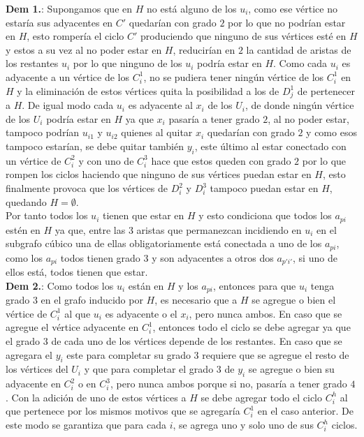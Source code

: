 \documentclass{article}
\begin{document}
\textbf{Dem 1.}: Supongamos que en $H$ no est\'a alguno de los $u_i$, como ese v\'ertice no estar\'ia sus adyacentes en $C'$ quedar\'ian con grado $2$ por lo que no podr\'ian estar en $H$, esto romper\'ia el ciclo $C'$ produciendo 
que ninguno de sus v\'ertices est\'e en $H$ y estos a su vez al no poder estar en $H$, reducir\'ian en $2$ la cantidad de aristas de los restantes $u_i$ por lo que ninguno de los $u_i$ podr\'ia estar en $H$. Como cada $u_i$ es adyacente a un v\'ertice de los $C_i^1$, no se pudiera tener ning\'un v\'ertice de los $C_i^1$ en $H$
y la eliminaci\'on de estos v\'ertices quita la posibilidad a los de $D_j^1$ de pertenecer a $H$. De igual modo cada $u_i$ es adyacente al $x_i$ de los $U_i$, de donde ning\'un v\'ertice de los $U_i$ podr\'ia estar en $H$ ya que $x_i$ pasar\'ia a tener grado $2$, al no poder estar, tampoco podr\'ian $u_{i1}$ y $u_{i2}$ quienes al quitar $x_i$ 
quedar\'ian con grado $2$ y como esos tampoco estar\'ian, se debe quitar tambi\'en $y_i$, este \'ultimo al estar conectado con un v\'ertice de $C_i^2$ y  con uno de $C_i^3$ hace que estos queden con grado $2$ por lo que rompen los ciclos 
haciendo que ninguno de sus v\'ertices puedan estar en $H$, esto finalmente provoca que los v\'ertices de $D_i^2$ y $D_i^3$ tampoco puedan estar en $H$, quedando $H = \emptyset$.\\ 

Por tanto todos los $u_i$ tienen que estar en $H$ y esto condiciona que todos los $a_{pi}$ est\'en en $H$ ya que, entre las $3$ aristas que permanezcan incidiendo en $u_i$ en el subgrafo c\'ubico 
una de ellas obligatoriamente est\'a conectada a uno de los $a_{pi}$, como los $a_{pi}$ todos tienen grado $3$ y son adyacentes a otros dos $a_{p'i'}$, si uno de ellos est\'a, todos tienen que estar.\\ 

\textbf{Dem 2.}: Como todos los $u_i$ est\'an en $H$ y los $a_{pi}$, entonces para que $u_i$ tenga grado $3$ en el grafo inducido por $H$, es necesario que a $H$ se agregue o bien el v\'ertice de $C_i^1$ al que $u_i$ es adyacente o el 
$x_i$, pero nunca ambos. En caso que se agregue el v\'ertice adyacente en $C_i^1$, entonces todo el ciclo se debe agregar ya que el grado $3$ de cada uno de los v\'ertices depende de los restantes. En caso que se agregara el $y_i$ este para completar su grado $3$
requiere que se agregue el resto de los v\'ertices del $U_i$ y que para completar el grado $3$ de $y_i$ se agregue o bien su adyacente en $C_i^2$ o  en $C_i^3$, pero nunca ambos porque si no, pasar\'ia a tener grado $4$. Con la adici\'on de uno de estos v\'ertices a 
$H$ se debe agregar todo el ciclo $C_i^h$ al que pertenece por los mismos motivos que se agregar\'ia $C_i^1$ en el caso anterior. De este modo se garantiza que para cada $i$, se agrega uno y solo uno de sus $C_i^h$ ciclos.\\ 
\end{document}
